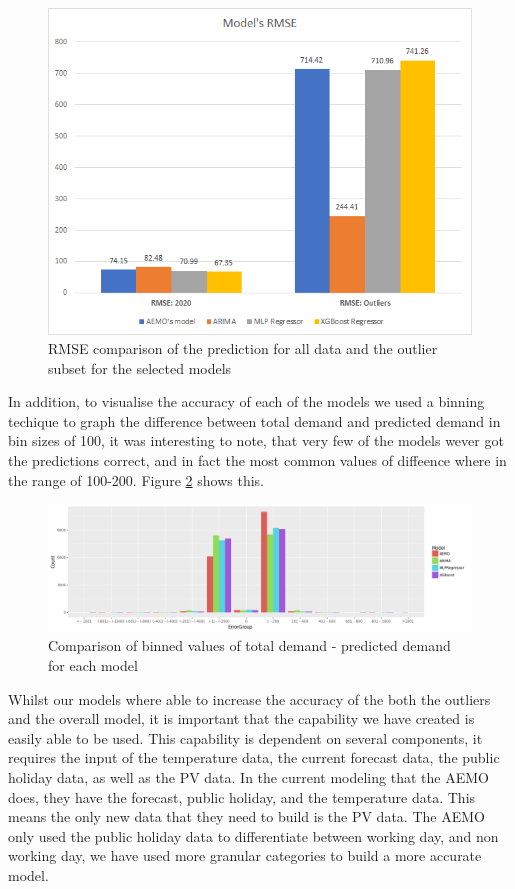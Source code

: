 \documentclass[mstat,12pt]{unswthesis}
\begin{document}
\begin{figure}[H]
\includegraphics[width=140mm]{image19.png}
\caption{RMSE comparison of the prediction for all data and the outlier subset for the selected models}
\label{image19}
\end{figure}

In addition, to visualise the accuracy of each of the models we used a
binning techique to graph the difference between total demand and
predicted demand in bin sizes of 100, it was interesting to note, that
very few of the models wever got the predictions correct, and in fact
the most common values of diffeence where in the range of 100-200.
Figure \ref{bin} shows this.

\begin{figure}[H]
\includegraphics[width=140mm]{image34.png}
\caption{Comparison of binned values of total demand - predicted demand for each model}
\label{bin}
\end{figure}

Whilst our models where able to increase the accuracy of the both the
outliers and the overall model, it is important that the capability we
have created is easily able to be used. This capability is dependent on
several components, it requires the input of the temperature data, the
current forecast data, the public holiday data, as well as the PV data.
In the current modeling that the AEMO does, they have the forecast,
public holiday, and the temperature data. This means the only new data
that they need to build is the PV data. The AEMO only used the public
holiday data to differentiate between working day, and non working day,
we have used more granular categories to build a more accurate model.
\end{document}
